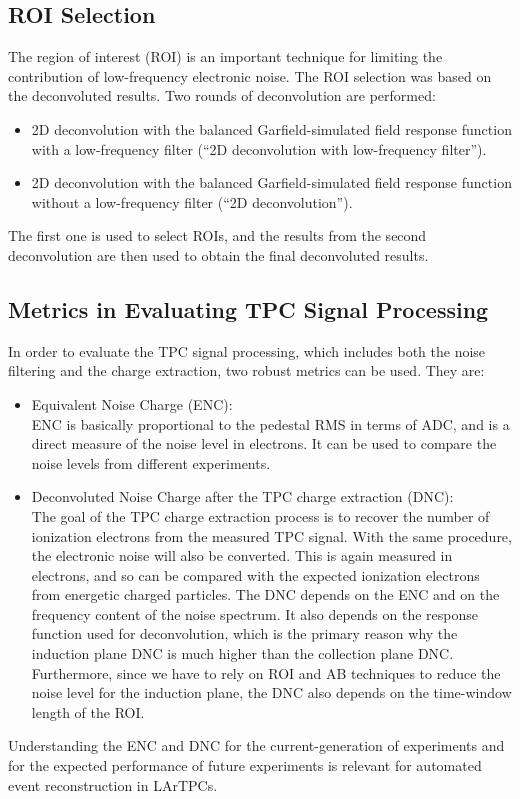 \subsection{ROI Selection}
\label{sec:decon-roi-selection}

The region of interest (ROI) is an important technique for limiting the contribution of low-frequency 
electronic noise. The ROI selection was based on the deconvoluted results. 
Two rounds of deconvolution are performed:
\begin{itemize}
\item 2D deconvolution with the balanced Garfield-simulated field response function with a low-frequency filter (``2D deconvolution with low-frequency filter'').
\item 2D deconvolution with the balanced Garfield-simulated field response function without a low-frequency filter (``2D deconvolution'').
\end{itemize}
The first one is used to select ROIs, and the results from the second deconvolution are then 
used to obtain the final deconvoluted results. 

\subsection{Metrics in Evaluating TPC Signal Processing}

In order to evaluate the TPC signal processing, which includes both the noise filtering and 
the charge extraction, two robust metrics can be used. %
They are:
\begin{itemize}
\item Equivalent Noise Charge (ENC): \\
  ENC is  basically proportional to the pedestal RMS in terms of ADC, and is a direct 
measure of the noise level in %
electrons. It can be used to compare the 
noise levels from different experiments.
\item Deconvoluted Noise Charge after the TPC charge extraction (DNC): \\
The goal of the TPC charge extraction process is to recover the number of ionization 
electrons from the measured TPC signal. With the same procedure, the electronic noise
will also be converted. %
This is again measured in electrons, %
and so can be compared with 
the expected ionization electrons from energetic charged particles. 
The DNC depends on the ENC and on the frequency content of the noise spectrum. It also depends 
on the response function used for deconvolution, which is the primary reason 
why the induction plane DNC is much higher than the collection plane DNC. Furthermore, since
we have to rely on ROI and AB techniques to reduce the noise level for the induction plane, the
DNC also depends on the time-window length of the ROI. 
\end{itemize}
Understanding the ENC and DNC for the current-generation of experiments and for the expected 
performance of future experiments is relevant for automated event reconstruction in LArTPCs.


